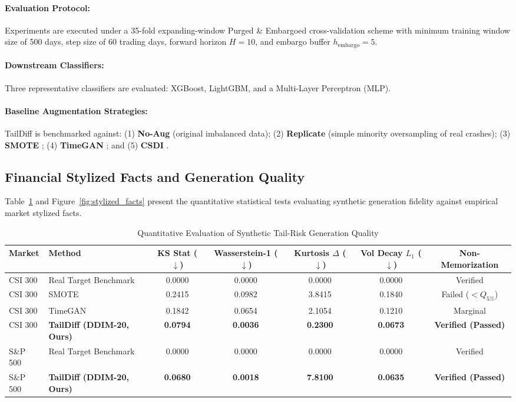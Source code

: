 \documentclass[preprint,12pt,authoryear]{elsarticle}
\begin{document}
\paragraph{Evaluation Protocol:} Experiments are executed under a 35-fold expanding-window Purged \& Embargoed cross-validation scheme with minimum training window size of 500 days, step size of 60 trading days, forward horizon $H = 10$, and embargo buffer $h_{\text{embargo}} = 5$.
\paragraph{Downstream Classifiers:} Three representative classifiers are evaluated: XGBoost, LightGBM, and a Multi-Layer Perceptron (MLP).
\paragraph{Baseline Augmentation Strategies:} TailDiff is benchmarked against: (1) \textbf{No-Aug} (original imbalanced data); (2) \textbf{Replicate} (simple minority oversampling of real crashes); (3) \textbf{SMOTE} \citep{chawla2002smote}; (4) \textbf{TimeGAN} \citep{yoon2019time}; and (5) \textbf{CSDI} \citep{tashiro2021csdi}.

\subsection{Financial Stylized Facts and Generation Quality}
Table~\ref{tab:generation_quality} and Figure~\ref{fig:stylized_facts} present the quantitative statistical tests evaluating synthetic generation fidelity against empirical market stylized facts.

\begin{table}[htbp]
\centering
\caption{Quantitative Evaluation of Synthetic Tail-Risk Generation Quality}
\label{tab:generation_quality}
\small
\begin{tabular}{llccccc}
\toprule
\textbf{Market} & \textbf{Method} & \textbf{KS Stat ($\downarrow$)} & \textbf{Wasserstein-1 ($\downarrow$)} & \textbf{Kurtosis $\Delta$ ($\downarrow$)} & \textbf{Vol Decay $L_1$ ($\downarrow$)} & \textbf{Non-Memorization} \\ \midrule
CSI 300 & Real Target Benchmark & 0.0000 & 0.0000 & 0.0000 & 0.0000 & Verified \\
CSI 300 & SMOTE \citep{chawla2002smote} & 0.2415 & 0.0982 & 3.8415 & 0.1840 & Failed ($< Q_{5\%}$) \\
CSI 300 & TimeGAN \citep{yoon2019time} & 0.1842 & 0.0654 & 2.1054 & 0.1210 & Marginal \\
CSI 300 & \textbf{TailDiff (DDIM-20, Ours)} & \textbf{0.0794} & \textbf{0.0036} & \textbf{0.2300} & \textbf{0.0673} & \textbf{Verified (Passed)} \\ \midrule
S\&P 500 & Real Target Benchmark & 0.0000 & 0.0000 & 0.0000 & 0.0000 & Verified \\
S\&P 500 & \textbf{TailDiff (DDIM-20, Ours)} & \textbf{0.0680} & \textbf{0.0018} & \textbf{7.8100} & \textbf{0.0635} & \textbf{Verified (Passed)} \\ \bottomrule
\end{tabular}
\end{table}
\end{document}
